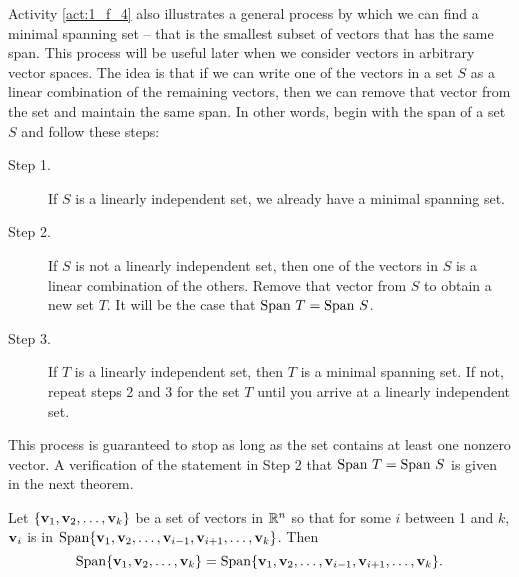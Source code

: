 Activity \ref{act:1_f_4} also illustrates a general process by which we can find a minimal spanning set -- that is the smallest subset of vectors that has the same span. This process will be useful later when we consider vectors in arbitrary vector spaces. The idea is that if we can write one of the vectors in a set $S$ as a linear combination of the remaining vectors, then we can remove that vector from the set and maintain the same span. In other words, begin with the span of a set $S$ and follow these steps:
\begin{description}
\item[Step 1.] If $S$ is a linearly independent set, we already have a minimal spanning set.
\item[Step 2.] If $S$ is not a linearly independent set, then one of the vectors in $S$ is a linear combination of the others. Remove that vector from $S$ to obtain a new set $T$. It will be the case that $\Span \ T = \Span \ S$.
\item[Step 3.] If $T$ is a linearly independent set, then $T$ is a minimal spanning set. If not, repeat steps 2 and 3 for the set $T$ until you arrive at a linearly independent set.
\end{description}
This process is guaranteed to stop as long as the set contains at least one nonzero vector. A verification of the statement in Step 2 that $\Span \ T = \Span \ S$ is given in the next theorem.



\begin{theorem} \label{thm:minimal_spanning_set} Let $\{\mathbf{v}_1, \mathbf{v}_2, \ldots, \mathbf{v}_k\}$ be a set of vectors in $\mathbb{R}^n$ so that for some $i$ between 1 and $k$, $\mathbf{v}_i$ is in $\text{Span} \{\mathbf{v}_1, \mathbf{v}_2, \ldots, \mathbf{v}_{i-1}, \mathbf{v}_{i+1}, \ldots, \mathbf{v}_k\}$. Then
\[\text{Span} \{\mathbf{v}_1, \mathbf{v}_2, \ldots, \mathbf{v}_k\} = \text{Span} \{\mathbf{v}_1, \mathbf{v}_2, \ldots, \mathbf{v}_{i-1}, \mathbf{v}_{i+1}, \ldots, \mathbf{v}_k\}.\]
\end{theorem}




